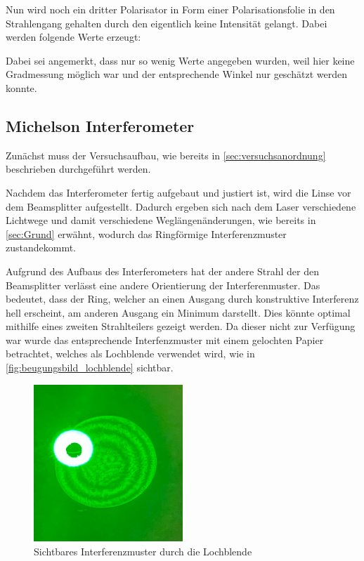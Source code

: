 \documentclass[12pt,english,ngerman]{scrartcl}
\begin{document}

Nun wird noch ein dritter Polarisator in Form einer Polarisationsfolie in den Strahlengang gehalten durch den eigentlich keine
Intensität gelangt. Dabei werden folgende Werte erzeugt:


Dabei sei angemerkt, dass nur so wenig Werte angegeben wurden, weil hier keine Gradmessung möglich war und der entsprechende 
Winkel nur geschätzt werden konnte.


\subsection{Michelson Interferometer}

Zunächst muss der Versuchsaufbau, wie bereits in \autoref{sec:versuchsanordnung} beschrieben durchgeführt werden.

Nachdem das Interferometer fertig aufgebaut und justiert ist, wird die Linse vor dem Beamsplitter aufgestellt. Dadurch ergeben 
sich nach dem Laser verschiedene Lichtwege und damit verschiedene Weglängenänderungen, wie bereits in \autoref{sec:Grund} 
erwähnt, wodurch das Ringförmige Interferenzmuster zustandekommt.

Aufgrund des Aufbaus des Interferometers hat der andere Strahl der den Beamsplitter verlässt eine andere Orientierung 
der Interferenmuster. Das bedeutet, dass der Ring, welcher an einen Ausgang durch konstruktive Interferenz hell erscheint,
am anderen Ausgang ein Minimum darstellt. Dies könnte optimal mithilfe eines zweiten Strahlteilers gezeigt werden. Da dieser 
nicht zur Verfügung war wurde das entsprechende Interfenzmuster mit einem gelochten Papier betrachtet, welches als Lochblende 
verwendet wird, wie in \autoref{fig:beugungsbild_lochblende} sichtbar.

\begin{figure}[H]
	\begin{center}
		\includegraphics[width =0.5\textwidth]{./figures/Blende.JPG}
	\end{center}
	\caption[Sichtbares Interferenzmuster durch die Lochblende] {
        Sichtbares Interferenzmuster durch die Lochblende
	}\label{fig:beugungsbild_lochblende}
\end{figure}
\end{document}
